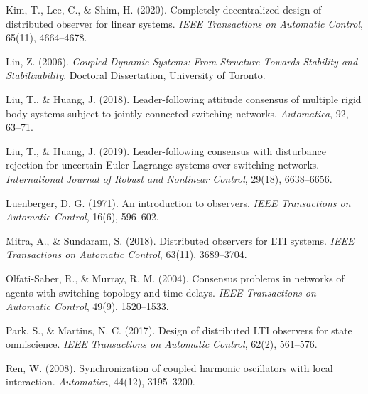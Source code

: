 \documentclass[twocolumn]{autart}
\begin{document}
\begin{thebibliography}{99}
Kim, T., Lee, C., \&  Shim, H. (2020).
\newblock Completely decentralized design of distributed observer for linear systems.
\newblock \emph{IEEE Transactions on Automatic Control}, 65(11), 4664--4678.


Lin, Z. (2006).
\newblock \emph{Coupled Dynamic Systems: From Structure Towards Stability and Stabilizability}.
\newblock Doctoral Dissertation, University of Toronto.


Liu, T., \& Huang, J. (2018).
\newblock Leader-following attitude consensus of multiple rigid body systems subject to jointly connected switching networks.
\newblock \emph{Automatica}, 92, 63--71.



Liu, T., \&  Huang, J. (2019).
\newblock Leader-following consensus with disturbance rejection for uncertain Euler-Lagrange systems over switching networks.
\newblock \emph{International Journal of Robust and Nonlinear Control}, 29(18), 6638--6656.



Luenberger, D. G. (1971).
\newblock An introduction to observers.
\newblock \emph{IEEE Transactions on Automatic Control}, 16(6), 596--602.


Mitra, A., \& Sundaram, S.  (2018).
\newblock Distributed observers for LTI systems.
\newblock \emph{IEEE Transactions on Automatic Control}, 63(11), 3689--3704.



Olfati-Saber, R., \& Murray, R. M. (2004).
\newblock Consensus problems in networks of agents with switching topology and time-delays.
\newblock \emph{IEEE Transactions on Automatic Control}, 49(9), 1520--1533.



Park, S., \& Martins,  N. C. (2017).
\newblock Design of distributed LTI observers for state omniscience.
\newblock \emph{IEEE Transactions on Automatic Control},  62(2), 561--576.



Ren, W. (2008).
\newblock  Synchronization of coupled harmonic oscillators with local interaction.
\newblock  \emph{Automatica}, 44(12), 3195--3200.




\end{thebibliography}
\end{document}

